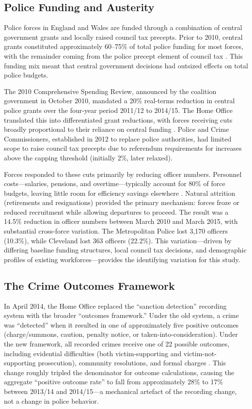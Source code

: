 \documentclass[12pt]{article}
\begin{document}
\subsection{Police Funding and Austerity}

Police forces in England and Wales are funded through a combination of central government grants and locally raised council tax precepts. Prior to 2010, central grants constituted approximately 60--75\% of total police funding for most forces, with the remainder coming from the police precept element of council tax \citep{nao2018}. This funding mix meant that central government decisions had outsized effects on total police budgets.

The 2010 Comprehensive Spending Review, announced by the coalition government in October 2010, mandated a 20\% real-terms reduction in central police grants over the four-year period 2011/12 to 2014/15. The Home Office translated this into differentiated grant reductions, with forces receiving cuts broadly proportional to their reliance on central funding \citep{hmic2014}. Police and Crime Commissioners, established in 2012 to replace police authorities, had limited scope to raise council tax precepts due to referendum requirements for increases above the capping threshold (initially 2\%, later relaxed).

Forces responded to these cuts primarily by reducing officer numbers. Personnel costs---salaries, pensions, and overtime---typically account for 80\% of force budgets, leaving little room for efficiency savings elsewhere \citep{crawford2015}. Natural attrition (retirements and resignations) provided the primary mechanism: forces froze or reduced recruitment while allowing departures to proceed. The result was a 14.5\% reduction in officer numbers between March 2010 and March 2015, with substantial cross-force variation. The Metropolitan Police lost 3,170 officers (10.3\%), while Cleveland lost 363 officers (22.2\%). This variation---driven by differing baseline funding structures, local council tax decisions, and demographic profiles of existing workforces---provides the identifying variation for this study.

\subsection{The Crime Outcomes Framework}

In April 2014, the Home Office replaced the ``sanction detection'' recording system with the broader ``outcomes framework.'' Under the old system, a crime was ``detected'' when it resulted in one of approximately five positive outcomes (charge/summons, caution, penalty notice, or taken-into-consideration). Under the new framework, all recorded crimes receive one of 22 possible outcomes, including evidential difficulties (both victim-supporting and victim-not-supporting prosecution), community resolutions, and formal charges \citep{homeoffice2019outcomes}. This change roughly tripled the denominator for outcome calculations, causing the aggregate ``positive outcome rate'' to fall from approximately 28\% to 17\% between 2013/14 and 2014/15---a mechanical artefact of the recording change, not a change in police behavior.
\end{document}
